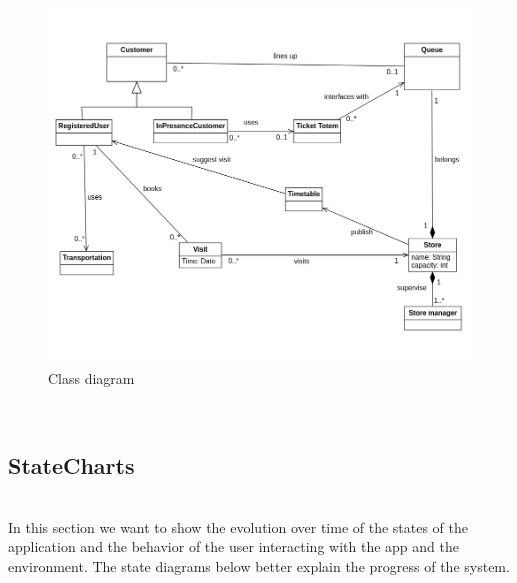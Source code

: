 \documentclass[]{article}
\begin{document}
		\begin{figure}[htp]
			\centering
			\includegraphics[scale=0.5]{UML_class_diagram.png}
			\caption{Class diagram}
			\label{fig:class_diagram}
		\end{figure}
		
	\textbf{}\\
		\subsection{StateCharts}
		
		\textbf{}\\ \newline
		In this section we want to show the evolution over time of the states of the application and the behavior of the user interacting with the app and the environment. 
The state diagrams below better explain the progress of the system.\\
		
		\textbf{}\\ \newline
		
\end{document}
